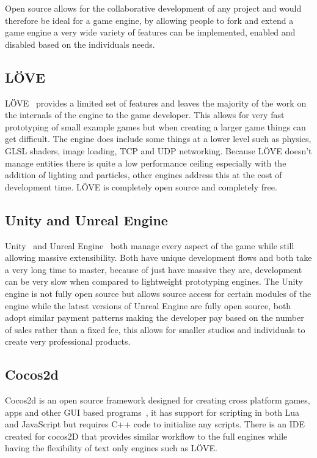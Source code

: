 \documentclass[11pt,a4paper,titlepage]{report}
\begin{document}
	Open source allows for the collaborative development of any project and would therefore be ideal for a game engine, by allowing people to fork and extend a game engine a very wide variety of features can be implemented, enabled and disabled based on the individuals needs.

\subsection{LÖVE}
	LÖVE~\cite{LOVE} provides a limited set of features and leaves the majority of the work on the internals of the engine to the game developer. This allows for very fast prototyping of small example games but when creating a larger game things can get difficult. The engine does include some things at a lower level such as physics, GLSL shaders, image loading, TCP and UDP networking. Because LÖVE doesn't manage entities there is quite a low performance ceiling especially with the addition of lighting and particles, other engines address this at the cost of development time. LÖVE is completely open source and completely free.

\subsection{Unity and Unreal Engine}
	Unity~\cite{Unity} and Unreal Engine~\cite{UE} both manage every aspect of the game while still allowing massive extensibility. Both have unique development flows and both take a very long time to master, because of just have massive they are, development can be very slow when compared to lightweight prototyping engines. The Unity engine is not fully open source but allows source access for certain modules of the engine while the latest versions of Unreal Engine are fully open source, both adopt similar payment patterns making the developer pay based on the number of sales rather than a fixed fee, this allows for smaller studios and individuals to create very professional products.

\subsection{Cocos2d}
	Cocos2d is an open source framework designed for creating cross platform games, apps and other GUI based programs~\cite{COCOS2D}, it has support for scripting in both Lua and JavaScript but requires C++ code to initialize any scripts. There is an IDE created for cocos2D that provides similar workflow to the full engines while having the flexibility of text only engines such as LÖVE.
\end{document}
